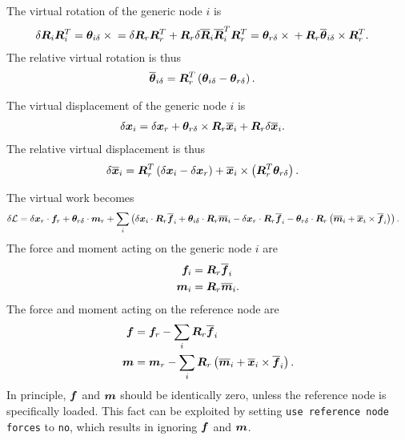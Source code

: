 The virtual rotation of the generic node $i$ is
\begin{align}
	\delta\bm{R}_i \bm{R}_i^T
	&=
	\bm{\theta}_{i\delta}\times{}
	=
	\delta\bm{R}_r \bm{R}_r^T
	+
	\bm{R}_r \delta\overline{\bm{R}}_i \overline{\bm{R}}_i^T \bm{R}_r^T
	=
	\bm{\theta}_{r\delta}\times{}
	+
	\bm{R}_r \overline{\bm{\theta}}_{i\delta}\times \bm{R}_r^T
	.
\end{align}
The relative virtual rotation is thus
\begin{align}
	\overline{\bm{\theta}}_{i\delta}
	&=
	\bm{R}_r^T \left( \bm{\theta}_{i\delta} - \bm{\theta}_{r\delta} \right)
	.
\end{align}

The virtual displacement of the generic node $i$ is
\begin{align}
	\delta\bm{x}_i
	&=
	\delta\bm{x}_r
	+
	\bm{\theta}_{r\delta}\times \bm{R}_r \overline{\bm{x}}_i
	+
	\bm{R}_r\delta\overline{\bm{x}}_i
	.
\end{align}
The relative virtual displacement is thus
\begin{align}
	\delta\overline{\bm{x}}_i
	&=
	\bm{R}_r^T \left( 
		\delta\bm{x}_i
		-
		\delta\bm{x}_r
	 \right)
	+
	\overline{\bm{x}}_i \times \left( \bm{R}_r^T \bm{\theta}_{r\delta} \right)
	.
\end{align}

The virtual work becomes
\begin{align}
	\delta\mathcal{L}
	&=
	\delta\bm{x}_r \cdot \bm{f}_r
	+
	\bm{\theta}_{r\delta} \cdot \bm{m}_r
	+
	\sum_i \left( 
		\delta\bm{x}_i \cdot \bm{R}_r \overline{\bm{f}}_i
		+
		\bm{\theta}_{i\delta} \cdot \bm{R}_r \overline{\bm{m}}_i
		-
		\delta\bm{x}_r \cdot \bm{R}_r \overline{\bm{f}}_i
		-
		\bm{\theta}_{r\delta} \cdot \bm{R}_r \left( 
			\overline{\bm{m}}_i
			+
			\overline{\bm{x}}_i \times \overline{\bm{f}}_i
		 \right)
	 \right)
	.
\end{align}
The force and moment acting on the generic node $i$ are
\begin{align}
	\bm{f}_i
	&=
	\bm{R}_r \overline{\bm{f}}_i
	\\
	\bm{m}_i
	&=
	\bm{R}_r \overline{\bm{m}}_i
	.
\end{align}
The force and moment acting on the reference node are
\begin{align}
	\bm{f}
	&=
	\bm{f}_r - \sum_i \bm{R}_r \overline{\bm{f}}_i
	\\
	\bm{m}
	&=
	\bm{m}_r - \sum_i \bm{R}_r \left( 
		\overline{\bm{m}}_i
		+
		\overline{\bm{x}}_i \times \overline{\bm{f}}_i
	 \right)
	.
\end{align}
In principle, $\bm{f}$ and $\bm{m}$ should be identically zero,
unless the reference node is specifically loaded.
This fact can be exploited by setting \texttt{use reference node forces}
to \texttt{no}, which results in ignoring $\bm{f}$ and $\bm{m}$.



